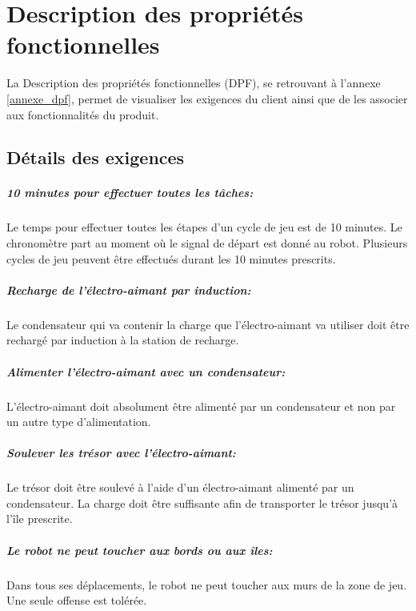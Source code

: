 \chapter{Description des propriétés fonctionnelles}
La Description des propriétés fonctionnelles (DPF), se retrouvant à l'annexe \ref{annexe_dpf}, permet de visualiser les exigences du client ainsi que de les associer aux fonctionnalités du produit.

\section{Détails des exigences}

\paragraph{10 minutes pour effectuer toutes les tâches:}
Le temps pour effectuer toutes les étapes d'un cycle de jeu est de 10 minutes. Le chronomètre part au moment où le signal de départ est donné au robot.
Plusieurs cycles de jeu peuvent être effectués durant les 10 minutes prescrits.

\paragraph{Recharge de l'électro-aimant par induction:}
Le condensateur qui va contenir la charge que l'électro-aimant va utiliser doit être rechargé par induction à la station de recharge.

\paragraph{Alimenter l'électro-aimant avec un condensateur:}
L'électro-aimant doit absolument être alimenté par un condensateur et non par un autre type d'alimentation.

\paragraph{Soulever les trésor avec l'électro-aimant:}
Le trésor doit être soulevé à l'aide d'un électro-aimant alimenté par un condensateur. La charge doit être suffisante afin de transporter le trésor jusqu'à l'île prescrite.

\paragraph{Le robot ne peut toucher aux bords ou aux îles:}
Dans tous ses déplacements, le robot ne peut toucher aux murs de la zone de jeu. Une seule offense est tolérée.

